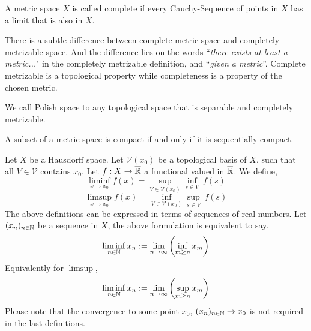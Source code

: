 \begin{definition}[Distance]
\end{definition}
\begin{definition}
	
\end{definition}

\begin{definition}[Completeness]
	A metric space $X$ is called complete if every Cauchy-Sequence of points in $X$ has a limit that is also in $X$. 
\end{definition}

\begin{definition}
	
\end{definition}
There is a subtle difference between complete metric space and completely metrizable space.  And the difference lies on the words ``\textit{there exists at least a metric...}" in the completely metrizable definition, and ``\textit{given a metric}''. Complete metrizable is a topological property while completeness is a property of the chosen metric.
\begin{definition}
	We call Polish space to any topological space that is separable and completely metrizable.
\end{definition}

\begin{theorem}
	A subset of a metric space is compact if and only if it is sequentially compact.
\end{theorem}


\begin{definition}
	Let $X$ be a Hausdorff space. Let $\mathcal{V}(x_0)$ be a topological basis of $X$, such that all $V\in \mathcal{V}$ contains $x_0$. Let $f: X\rightarrow \overline{\mathbb{R}}$ a functional valued in $\overline{\mathbb{R}}$. We define, 
	\begin{equation*}
	\liminf_{x\rightarrow x_0} f(x)= \sup_{V\in \mathcal{V}(x_0)} \inf_{s\in V}\ f(s)
	\end{equation*}
	\begin{equation*}
	\limsup_{x\rightarrow x_0} f(x)= \inf_{V\in \mathcal{V}(x_0)} \sup_{s\in V}\ f(s)
	\end{equation*}
	The above definitions can be expressed in terms of sequences of real numbers. Let $(x_n)_{n \in \mathbb{N}}$ be a sequence in $X$, the above formulation is equivalent to say.
	\begin{equation*}
	\liminf_{n\in \mathbb{N}} x_n := \lim_{n\rightarrow \infty} \left( \inf_{m\geq n} x_m \right)
	\end{equation*}
	Equivalently for $\limsup$,
	\begin{equation*}
	\liminf_{n\in \mathbb{N}} x_n := \lim_{n\rightarrow \infty} \left( \sup_{m\geq n} x_m \right)
	\end{equation*}
	Please note that the convergence to some point $x_0$, $(x_n)_{n\in \mathbb{N}}\rightarrow x_0$ is not required in the last definitions.
\end{definition}



